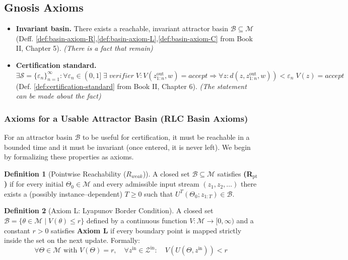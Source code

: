 \documentclass{article}
\theoremstyle{definition}
\newtheorem{definition}{Definition}[section]
\theoremstyle{plain}
\begin{document}
\subsection{Gnosis Axioms}
\begin{itemize}
  \item[(F)] \textbf{Invariant basin.} There exists a reachable, invariant attractor basin $\mathcal B\subseteq\mathcal M$ (Deff. \ref{def:basin-axiom-R},\ref{def:basin-axiom-L},\ref{def:basin-axiom-C} from Book II, Chapter 5). \emph{(There is a fact that remain)}
  \item[(S)] \textbf{Certification  standard.} $\exists \mathcal{S} = \{\varepsilon_n\}_{n=1}^\infty: \forall \varepsilon_n \in (0, 1]\; \exists\; verifier \; V: V(z^{\text{out}}_{1:n}, w)=accept \Longrightarrow \forall z: d(z,z^{\text{out}}_{1:n}, w))<\varepsilon_n\; V(z)=accept$ (Def. \ref{def:certification-standard} from Book II, Chapter 6). \emph{(The statement can be made about the fact)} 
\end{itemize}

\subsubsection{Axioms for a Usable Attractor Basin (RLC Basin Axioms)}

For an attractor basin $\mathcal{B}$ to be useful for certification, it must be reachable in a bounded time and it must be invariant (once entered, it is never left). We begin by formalizing these properties as axioms.

\begin{definition}[Pointwise Reachability ($R_{weak}$)]
A closed set $\mathcal B\subseteq\mathcal M$ satisfies \textbf{(R$_{\mathrm{pt}}$)} if for every initial
$\Theta_0\in\mathcal M$ and every admissible input stream $(z_1,z_2,\dots)$
there exists a (possibly instance–dependent) $T\ge0$ such that
$U^T(\Theta_0;z_{1:T})\in\mathcal B$.
\end{definition}

\begin{definition}[Axiom L: Lyapunov Border Condition]
A closed set $\mathcal{B} = \{\theta \in \mathcal{M} \mid V(\theta) \le r\}$ defined by a continuous function $V: \mathcal{M} \to [0, \infty)$ and a constant $r > 0$ satisfies \textbf{Axiom L} if every boundary point is mapped strictly inside the set on the next update. Formally:
\[
\forall \Theta \in \mathcal{M} \text{ with } V(\Theta) = r, \quad \forall z^{\text{in}} \in \mathcal{Z}^{\text{in}}: \quad V(U(\Theta, z^{\text{in}})) < r
\]
\end{definition}
\end{document}
